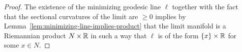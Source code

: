 \begin{proof}
The existence of the minimizing geodesic line $\ell$ together with
the fact that the sectional curvatures of the limit are $\ge 0$
implies by Lemma~\ref{lem:minimizing-line-implies-product} that the limit manifold is a Riemannian
product $N\times \mathbb{R}$ in such a way that $\ell$ is of the form
$\{x\}\times \mathbb{R}$ for some $x\in N$.
\end{proof}
